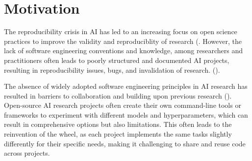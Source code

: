 
\section{Motivation}


The reproducibility crisis in AI has led to an increasing focus on open science practices to improve the validity and reproduciblity of research (\cite{coro2020open,braun2018open,hicks2021open,paton2019open,kocak2022transparency,stodden-towardreprodicibleresearch}. However, the lack of software engineering conventions and knowledge, among researchers and practitioners often leads to poorly structured and documented AI projects, resulting in reproducibility issues, bugs, and invalidation of research. (\cite{leakage-recrisis,epskamp2019reproducibilitybug, seAIsurvey, martinez2022softwareAI,mainatiblity}).
 

The absence of widely adopted software engineering principles in AI research has resulted in barriers to collaboration and building upon previous research (\cite{accountabilityInAi}). Open-source AI research projects often create their own command-line tools or frameworks to experiment with different models and hyperparameters, which can result in comprehensive options but also limitations. This often leads to the reinvention of the wheel, as each project implements the same tasks slightly differently for their specific needs, making it challenging to share and reuse code across projects. 


